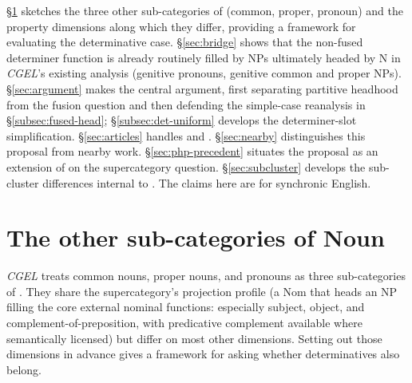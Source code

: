 \documentclass[12pt]{article}
\begin{document}
§\ref{sec:existing} sketches the three other sub-categories of  (common, proper, pronoun) and the property dimensions along which they differ, providing a framework for evaluating the determinative case. §\ref{sec:bridge} shows that the non-fused determiner function is already routinely filled by NPs ultimately headed by N in \textit{CGEL}'s existing analysis (genitive pronouns, genitive common and proper NPs). §\ref{sec:argument} makes the central argument, first separating partitive headhood from the fusion question and then defending the simple-case reanalysis in §\ref{subsec:fused-head}; §\ref{subsec:det-uniform} develops the determiner-slot simplification. §\ref{sec:articles} handles  and . §\ref{sec:nearby} distinguishes this proposal from nearby work. §\ref{sec:php-precedent} situates the proposal as an extension of \textcite{payne2010} on the supercategory question. §\ref{sec:subcluster} develops the sub-cluster differences internal to . The claims here are for synchronic English.

\section{The other sub-categories of Noun}\label{sec:existing}

\textit{CGEL} treats common nouns, proper nouns, and pronouns as three sub-categories of . They share the supercategory's projection profile (a Nom that heads an NP filling the core external nominal functions: especially subject, object, and complement-of-preposition, with predicative complement available where semantically licensed) but differ on most other dimensions. Setting out those dimensions in advance gives a framework for asking whether determinatives also belong.
\end{document}
